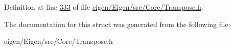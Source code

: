 Definition at line \hyperlink{eigen_2_eigen_2src_2_core_2_transpose_8h_source_l00333}{333} of file \hyperlink{eigen_2_eigen_2src_2_core_2_transpose_8h_source}{eigen/\+Eigen/src/\+Core/\+Transpose.\+h}.



The documentation for this struct was generated from the following file\+:\begin{DoxyCompactItemize}
\item 
eigen/\+Eigen/src/\+Core/\+Transpose.\+h\end{DoxyCompactItemize}
